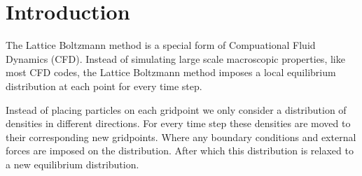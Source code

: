 \documentclass[8pt,twocolumn]{article}
\begin{document}

\section*{Introduction}
The Lattice Boltzmann method is a special form of Compuational Fluid Dynamics (CFD). Instead of simulating large scale macroscopic properties, like most CFD codes, the Lattice Boltzmann method imposes a local equilibrium distribution at each point for every time step. 

Instead of placing particles on each gridpoint we only consider a distribution of densities in different directions. For every time step these densities are moved to their corresponding new gridpoints. Where any boundary conditions and external forces are imposed on the distribution. After which this distribution is relaxed to a new equilibrium distribution.
\end{document}
